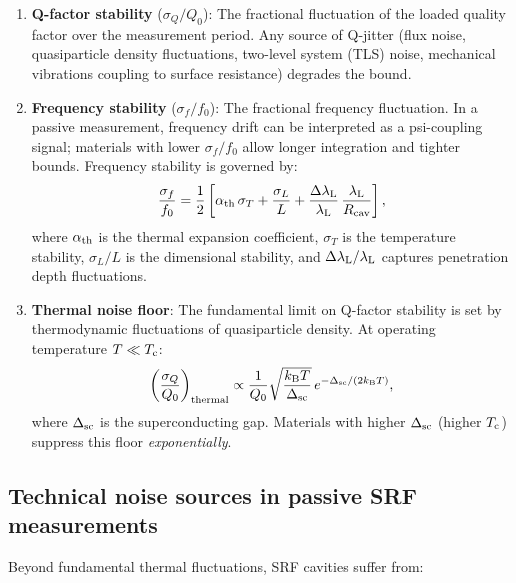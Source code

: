 \documentclass[11pt]{article}
\theoremstyle{definition}
\theoremstyle{remark}
\newcommand{\Tc}{T_{\rm c}}
\newcommand{\lambdaL}{\lambda_{\rm L}}
\begin{document}
\begin{enumerate}
  \item \textbf{Q-factor stability} ($\sigma_Q/Q_0$): The fractional
    fluctuation of the loaded quality factor over the measurement period.
    Any source of Q-jitter (flux noise, quasiparticle density fluctuations,
    two-level system (TLS) noise, mechanical vibrations coupling to
    surface resistance) degrades the bound.

  \item \textbf{Frequency stability} ($\sigma_f/f_0$): The fractional
    frequency fluctuation. In a passive measurement, frequency drift
    can be interpreted as a psi-coupling signal; materials with lower
    $\sigma_f/f_0$ allow longer integration and tighter bounds.
    Frequency stability is governed by:
    \begin{equation}
      \frac{\sigma_f}{f_0} = \frac{1}{2}\left[
      \alpha_{\rm th}\,\sigma_T
      + \frac{\sigma_L}{L}
      + \frac{\Delta\lambdaL}{\lambdaL}\,\frac{\lambdaL}{R_{\rm cav}}
      \right],
      \label{eq:freq_stability}
    \end{equation}
    where $\alpha_{\rm th}$ is the thermal expansion coefficient,
    $\sigma_T$ is the temperature stability, $\sigma_L/L$ is the
    dimensional stability, and $\Delta\lambdaL/\lambdaL$ captures
    penetration depth fluctuations.

  \item \textbf{Thermal noise floor}: The fundamental limit on Q-factor
    stability is set by thermodynamic fluctuations of quasiparticle
    density. At operating temperature $T \ll \Tc$:
    \begin{equation}
      \left(\frac{\sigma_Q}{Q_0}\right)_{\rm thermal}
      \propto \frac{1}{Q_0}\sqrt{\frac{k_{\rm B}T}{\Delta_{\rm sc}}}
      \,e^{-\Delta_{\rm sc}/(2k_{\rm B}T)},
      \label{eq:Q_thermal_noise}
    \end{equation}
    where $\Delta_{\rm sc}$ is the superconducting gap. Materials with
    higher $\Delta_{\rm sc}$ (higher $\Tc$) suppress this floor
    \emph{exponentially}.
\end{enumerate}

\subsection{Technical noise sources in passive SRF measurements}

Beyond fundamental thermal fluctuations, SRF cavities suffer from:
\end{document}
